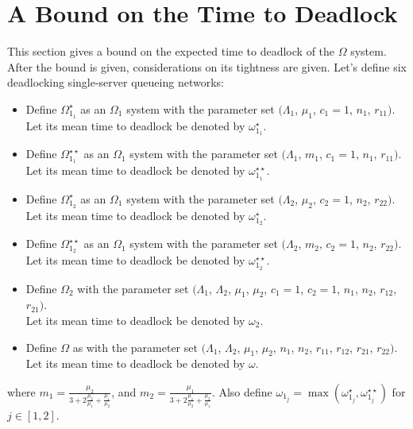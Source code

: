 \documentclass{article}
\numberwithin{equation}{section}
\begin{document}
\section{A Bound on the Time to Deadlock}\label{sec:bound}

This section gives a bound on the expected time to deadlock of the $\Omega$ system.
After the bound is given, considerations on its tightness are given.
Let's define six deadlocking single-server queueing networks:

\begin{itemize}
  \item Define $\Omega_{1_1}^{\star}$ as an $\Omega_1$ system with the parameter set $(\Lambda_1$, $\mu_1$, $c_1=1$, $n_1$, $r_{11})$.\\Let its mean time to deadlock be denoted by $\omega_{1_1}^{\star}$.
  \item Define $\Omega_{1_1}^{\star\star}$ as an $\Omega_1$ system with the parameter set $(\Lambda_1$, $m_1$, $c_1=1$, $n_1$, $r_{11})$.\\Let its mean time to deadlock be denoted by $\omega_{1_1}^{\star\star}$.
  \item Define $\Omega_{1_2}^{\star}$ as an $\Omega_1$ system with the parameter set $(\Lambda_2$, $\mu_2$, $c_2=1$, $n_2$, $r_{22})$.\\Let its mean time to deadlock be denoted by $\omega_{1_2}^{\star}$.
  \item Define $\Omega_{1_2}^{\star\star}$ as an $\Omega_1$ system with the parameter set $(\Lambda_2$, $m_2$, $c_2=1$, $n_2$, $r_{22})$.\\Let its mean time to deadlock be denoted by $\omega_{1_2}^{\star\star}$.
  \item Define $\Omega_2$ with the parameter set $(\Lambda_1$, $\Lambda_2$, $\mu_1$, $\mu_2$, $c_1=1$, $c_2=1$, $n_1$, $n_2$, $r_{12}$, $r_{21})$.\\Let its mean time to deadlock be denoted by $\omega_2$.
  \item Define $\Omega$ as with the parameter set $(\Lambda_1$, $\Lambda_2$, $\mu_1$, $\mu_2$, $n_1$, $n_2$, $r_{11}$, $r_{12}$, $r_{21}$, $r_{22})$.\\Let its mean time to deadlock be denoted by $\omega$.
\end{itemize}

where $m_1 = \frac{\mu_2}{3 + 2\frac{\mu_2}{\mu_1} + \frac{\mu_1}{\mu_2}}$, and $m_2 = \frac{\mu_1}{3 + 2\frac{\mu_1}{\mu_2} + \frac{\mu_2}{\mu_1}}$.
Also define $\omega_{1_j} = \max(\omega_{1_j}^{\star}, \omega_{1_j}^{\star\star})$ for $j \in [1, 2]$.
\end{document}
